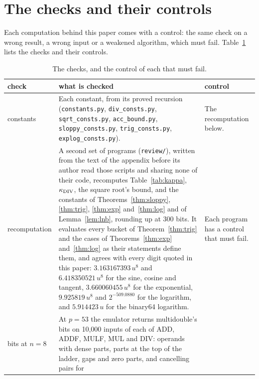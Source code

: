 
\section{The checks and their controls}\label{sec:checks}

Each computation behind this paper comes with a control: the same check on a wrong result, a wrong input or a weakened
algorithm, which must fail. Table~\ref{tab:checks} lists the checks and their controls.

\begin{table}[tp]
\centering
\caption{The checks, and the control of each that must fail.}
\label{tab:checks}
\footnotesize
\begin{tabular}{@{}>{\raggedright\arraybackslash}p{}>{\raggedright\arraybackslash}p{}>{\raggedright\arraybackslash}p{}@{}}
\toprule
check & what is checked & control \\
\midrule
constants & Each constant, from its proved recursion (\texttt{constants.py}, \texttt{div\_consts.py},
\texttt{sqrt\_consts.py}, \texttt{acc\_bound.py}, \texttt{sloppy\_consts.py}, \texttt{trig\_consts.py},
\texttt{explog\_consts.py}). & The recomputation below. \\ \addlinespace
recomputation & A second set of programs (\texttt{review/}), written from the text of the appendix before its author
read those scripts and sharing none of their code, recomputes Table~\ref{tab:kappa}, $\kappa_{\rm DIV}$, the square root's
bound, and the constants of Theorems~\ref{thm:sloppy}, \ref{thm:trig}, \ref{thm:exp} and~\ref{thm:log} and of
Lemma~\ref{lem:lnb}, rounding up at 300 bits. It evaluates every bucket of Theorem~\ref{thm:trig} and the cases of
Theorems~\ref{thm:exp} and~\ref{thm:log} as their statements define them, and agrees with every digit quoted in this
paper: $3.163167393\,u^8$ and $6.418350521\,u^8$ for the sine, cosine and tangent, $3.660060455\,u^8$ for the
exponential, $9.925819\,u^8$ and $2^{-509.0880}$ for the logarithm, and $5.914423\,u$ for the binary64 logarithm. &
Each program has a control that must fail. \\ \addlinespace
bits at $n = 8$ & At $p = 53$ the emulator returns multidouble's bits on 10,000 inputs of each of ADD, ADDF, MULF,
MUL and DIV: operands with dense parts, parts at the top of the ladder, gaps and zero parts, and cancelling pairs for

\end{tabular}
\end{table}
